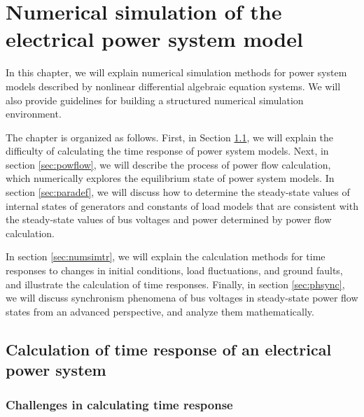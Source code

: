 \documentclass[graybox, envcountchap]{svmult}
\begin{document}
\chapter{Numerical simulation of the electrical power system
model}\label{chap:numcal}
In this chapter, we will explain numerical simulation methods for power system
models described by nonlinear differential algebraic equation systems. We will
also provide guidelines for building a structured numerical simulation
environment.

The chapter is organized as follows. First, in Section \ref{sec:howtocal}, we
will explain the difficulty of calculating the time response of power system
models. Next, in section \ref{sec:powflow}, we will describe the process of
power flow calculation, which numerically explores the equilibrium state of
power system models. In section \ref{sec:paradef}, we will discuss how to
determine the steady-state values of internal states of generators and constants
of load models that are consistent with the steady-state values of bus voltages
and power determined by power flow calculation.

In section \ref{sec:numsimtr}, we will explain the calculation methods for time
responses to changes in initial conditions, load fluctuations, and ground
faults, and illustrate the calculation of time responses. Finally, in section
\ref{sec:phsync}, we will discuss synchronism phenomena of bus voltages in
steady-state power flow states from an advanced perspective, and analyze them
mathematically.

\section{Calculation of time response of an electrical power
system}\label{sec:howtocal}

\subsection{Challenges in calculating time response}
\end{document}
